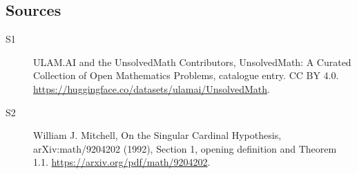 \documentclass[11pt]{article}
\begin{document}
\subsection{Sources}
\begin{description}
\item[\hypertarget{source:statement:1}{S1}] ULAM.AI and the UnsolvedMath Contributors, UnsolvedMath: A Curated Collection of Open Mathematics Problems, catalogue entry. CC BY 4.0. \url{https://huggingface.co/datasets/ulamai/UnsolvedMath}.
\item[\hypertarget{source:statement:2}{S2}] William J. Mitchell, On the Singular Cardinal Hypothesis, arXiv:math/9204202 (1992), Section 1, opening definition and Theorem 1.1. \url{https://arxiv.org/pdf/math/9204202}.
\end{description}
\label{end:statement}
\end{document}
